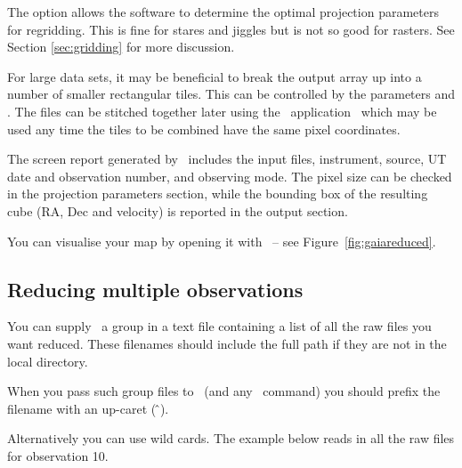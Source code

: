\documentclass[11pt,oneside,chapters]{starlink}
\begin{document}
The  option allows the
software to determine the optimal projection parameters for
regridding. This is fine for stares and jiggles but is not so good for
rasters. See Section \ref{sec:gridding} for more discussion.

For large data sets, it may be beneficial to break the output array up
into a number of smaller rectangular tiles. This can be controlled by
the parameters  and . The files can
be stitched together later using the \Kappa\ application \paste\ which
may be used any time the tiles to be combined have the same pixel
coordinates.

The screen report generated by \makecube\ includes the input files,
instrument, source, UT date and observation number, and observing
mode. The pixel size can be checked in the projection parameters
section, while the bounding box of the resulting cube (RA, Dec and
velocity) is reported in the output section.

You can visualise your map by opening it with \gaia\ -- see
Figure~\ref{fig:gaiareduced}.


\subsection{Reducing multiple observations}

You can supply \makecube\ a group in a text file containing a list of
all the raw files you want reduced. These filenames should include the
full path if they are not in the local directory.

When you pass such group files to \makecube\ (and any \starlink\ command)
you should prefix the filename with an up-caret (\,\^\,).
\begin{terminalv}
\end{terminalv}

Alternatively you can use wild cards. The example below reads in all
the raw files for observation 10.
\begin{terminalv}
\end{terminalv}
\end{document}
